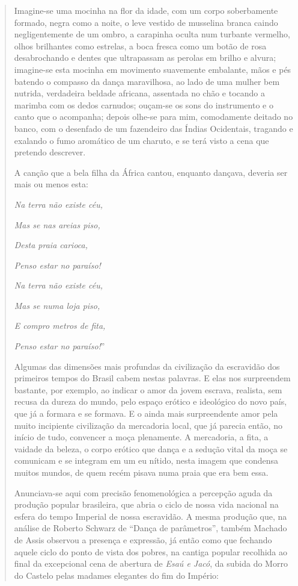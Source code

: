 \begin{quote}
Imagine-se uma mocinha na flor da idade, com um corpo soberbamente
formado, negra como a noite, o leve vestido de musselina branca caindo
negligentemente de um ombro, a carapinha oculta num turbante vermelho,
olhos brilhantes como estrelas, a boca fresca como um botão de rosa
desabrochando e dentes que ultrapassam as perolas em brilho e alvura;
imagine-se esta mocinha em movimento suavemente embalante, mãos e pés
batendo o compasso da dança maravilhosa, ao lado de uma mulher bem
nutrida, verdadeira beldade africana, assentada no chão e tocando a
marimba com os dedos carnudos; ouçam-se os sons do instrumento e o canto
que o acompanha; depois olhe-se para mim, comodamente deitado no banco,
com o desenfado de um fazendeiro das Índias Ocidentais, tragando e
exalando o fumo aromático de um charuto, e se terá visto a cena que
pretendo descrever.

A canção que a bela filha da África cantou, enquanto dançava, deveria
ser mais ou menos esta:

\emph{Na terra não existe céu,}

\emph{Mas se nas areias piso,}

\emph{Desta praia carioca,}

\emph{Penso estar no paraíso!}

\emph{Na terra não existe céu,}

\emph{Mas se numa loja piso,}

\emph{E compro metros de fita,}

\emph{Penso estar no paraíso!}''

Algumas das dimensões mais profundas da civilização da escravidão dos
primeiros tempos do Brasil cabem nestas palavras. E elas nos surpreendem
bastante, por exemplo, ao indicar o amor da jovem escrava, realista, sem
recusa da dureza do mundo, pelo espaço erótico e ideológico do novo
país, que já a formara e se formava. E o ainda mais surpreendente amor
pela muito incipiente civilização da mercadoria local, que já parecia
então, no início de tudo, convencer a moça plenamente. A mercadoria, a
fita, a vaidade da beleza, o corpo erótico que dança e a sedução vital
da moça se comunicam e se integram em um eu nítido, nesta imagem que
condensa muitos mundos, de quem recém pisava numa praia que era bem
essa.

Anunciava-se aqui com precisão fenomenológica a percepção aguda da
produção popular brasileira, que abria o ciclo de nossa vida nacional na
esfera do tempo Imperial de nossa escravidão. A mesma produção que, na
análise de Roberto Schwarz de ``Dança de parâmetros'', também Machado de
Assis observou a presença e expressão, já então como que fechando aquele
ciclo do ponto de vista dos pobres, na cantiga popular recolhida ao
final da excepcional cena de abertura de \emph{Esaú e Jacó}, da subida
do Morro do Castelo pelas madames elegantes do fim do Império:


\end{quote}
